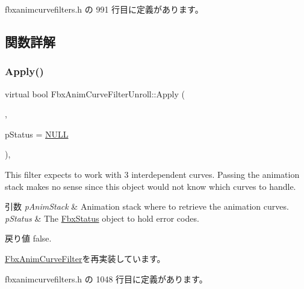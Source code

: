  fbxanimcurvefilters.\+h の 991 行目に定義があります。



\subsection{関数詳解}
\mbox{\label{class_fbx_anim_curve_filter_unroll_ae9b4807d576e93ae4800c1764f2aabda}} 
\subsubsection{\texorpdfstring{Apply()}{Apply()}\hspace{0.1cm}{\footnotesize\ttfamily [1/5]}}
{\footnotesize\ttfamily virtual bool Fbx\+Anim\+Curve\+Filter\+Unroll\+::\+Apply (\begin{DoxyParamCaption}\item[{\hyperlink{class_fbx_anim_stack}{Fbx\+Anim\+Stack} $\ast$}]{,  }\item[{\hyperlink{class_fbx_status}{Fbx\+Status} $\ast$}]{p\+Status = {\ttfamily \hyperlink{fbxarch_8h_a070d2ce7b6bb7e5c05602aa8c308d0c4}{N\+U\+LL}} }\end{DoxyParamCaption})\hspace{0.3cm}{\ttfamily [inline]}, {\ttfamily [virtual]}}

This filter expects to work with 3 interdependent curves. Passing the animation stack makes no sense since this object would not know which curves to handle. 
\begin{DoxyParams}{引数}
{\em p\+Anim\+Stack} & Animation stack where to retrieve the animation curves. \\
\hline
{\em p\+Status} & The \hyperlink{class_fbx_status}{Fbx\+Status} object to hold error codes. \\
\hline
\end{DoxyParams}
\begin{DoxyReturn}{戻り値}
{\ttfamily false}. 
\end{DoxyReturn}


\hyperlink{class_fbx_anim_curve_filter_aef3900e6180e05661c27ee484ae939c3}{Fbx\+Anim\+Curve\+Filter}を再実装しています。



 fbxanimcurvefilters.\+h の 1048 行目に定義があります。

